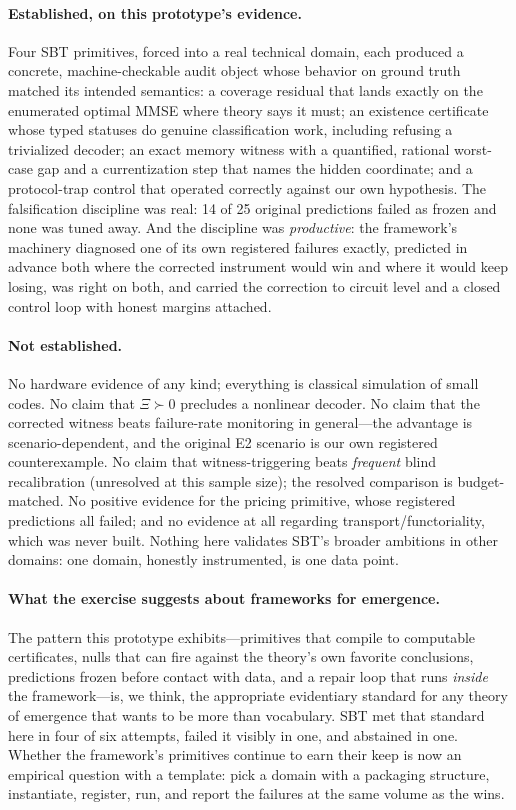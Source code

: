 \documentclass[11pt]{article}
\theoremstyle{definition}
\begin{document}
\paragraph{Established, on this prototype's evidence.} Four SBT primitives, forced into a real technical domain, each produced a concrete, machine-checkable audit object whose behavior on ground truth matched its intended semantics: a coverage residual that lands exactly on the enumerated optimal MMSE where theory says it must; an existence certificate whose typed statuses do genuine classification work, including refusing a trivialized decoder; an exact memory witness with a quantified, rational worst-case gap and a currentization step that names the hidden coordinate; and a protocol-trap control that operated correctly against our own hypothesis. The falsification discipline was real: 14 of 25 original predictions failed as frozen and none was tuned away. And the discipline was \emph{productive}: the framework's machinery diagnosed one of its own registered failures exactly, predicted in advance both where the corrected instrument would win and where it would keep losing, was right on both, and carried the correction to circuit level and a closed control loop with honest margins attached. 

\paragraph{Not established.} No hardware evidence of any kind; everything is classical simulation of small codes. No claim that $\Xi \succ 0$ precludes a nonlinear decoder. No claim that the corrected witness beats failure-rate monitoring in general---the advantage is scenario-dependent, and the original E2 scenario is our own registered counterexample. No claim that witness-triggering beats \emph{frequent} blind recalibration (unresolved at this sample size); the resolved comparison is budget-matched. No positive evidence for the pricing primitive, whose registered predictions all failed; and no evidence at all regarding transport/functoriality, which was never built. Nothing here validates SBT's broader ambitions in other domains: one domain, honestly instrumented, is one data point.

\paragraph{What the exercise suggests about frameworks for emergence.} The pattern this prototype exhibits---primitives that compile to computable certificates, nulls that can fire against the theory's own favorite conclusions, predictions frozen before contact with data, and a repair loop that runs \emph{inside} the framework---is, we think, the appropriate evidentiary standard for any theory of emergence that wants to be more than vocabulary. SBT met that standard here in four of six attempts, failed it visibly in one, and abstained in one. Whether the framework's primitives continue to earn their keep is now an empirical question with a template: pick a domain with a packaging structure, instantiate, register, run, and report the failures at the same volume as the wins.
\end{document}
